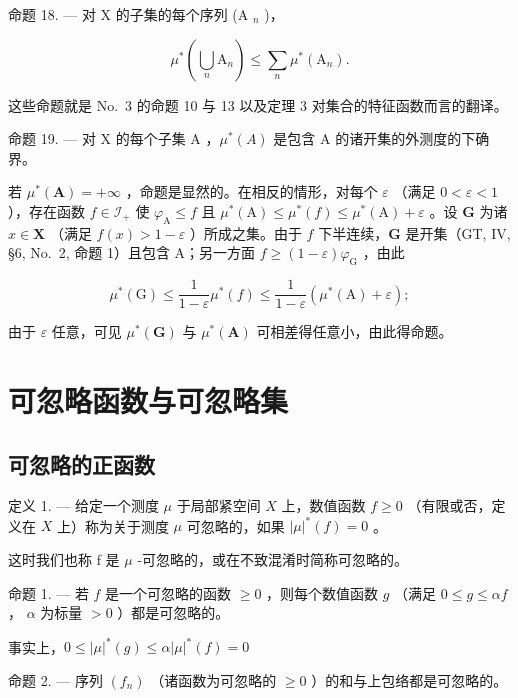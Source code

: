 命题 18. --- 对 X 的子集的每个序列 (A \(_{n}\) )，

\[
\mu^ {*} \left(\bigcup_ {n} \mathrm{A} _ {n}\right) \leqslant \sum_ {n} \mu^ {*} (\mathrm{A} _ {n}).
\]

这些命题就是 No.~3 的命题 10 与 13 以及定理 3 对集合的特征函数而言的翻译。

命题 19. --- 对 X 的每个子集 A ，\(\mu^{*}(A)\) 是包含 A 的诸开集的外测度的下确界。

若 \(\mu^{*}(\mathbf{A}) = +\infty\) ，命题是显然的。在相反的情形，对每个 \(\varepsilon\) （满足 \(0 < \varepsilon < 1\) ），存在函数 \(f \in \mathcal{I}_{+}\) 使 \(\varphi_{\mathrm{A}} \leqslant f\) 且 \(\mu^{*}(\mathrm{A}) \leqslant \mu^{*}(f) \leqslant \mu^{*}(\mathrm{A}) + \varepsilon\) 。设 \(\mathbf{G}\) 为诸 \(x \in \mathbf{X}\) （满足 \(f(x) > 1 - \varepsilon\) ）所成之集。由于 \(f\) 下半连续，\(\mathbf{G}\) 是开集（GT, IV, §6, No.~2, 命题 1）且包含 A；另一方面 \(f \geqslant (1 - \varepsilon)\varphi_{\mathrm{G}}\) ，由此

\[
\mu^ {*} (\mathrm{G}) \leqslant \frac {1}{1 - \varepsilon} \mu^ {*} (f) \leqslant \frac {1}{1 - \varepsilon} \left(\mu^ {*} (\mathrm{A}) + \varepsilon\right);
\]

由于 \(\varepsilon\) 任意，可见 \(\mu^{*}(\mathbf{G})\) 与 \(\mu^{*}(\mathbf{A})\) 可相差得任意小，由此得命题。

\section{可忽略函数与可忽略集}

\subsection{可忽略的正函数}

定义 1. --- 给定一个测度 \(\mu\) 于局部紧空间 \(X\) 上，数值函数 \(f \geqslant 0\) （有限或否，定义在 \(X\) 上）称为关于测度 \(\mu\) 可忽略的，如果 \(|\mu|^*(f) = 0\) 。

这时我们也称 f 是 \(\mu\) -可忽略的，或在不致混淆时简称可忽略的。

命题 1. --- 若 \(f\) 是一个可忽略的函数 \(\geqslant 0\) ，则每个数值函数 \(g\) （满足 \(0 \leqslant g \leqslant \alpha f\) ， \(\alpha\) 为标量 \(> 0\) ）都是可忽略的。

事实上，\(0 \leqslant |\mu|^*(g) \leqslant \alpha |\mu|^*(f) = 0\)

命题 2. --- 序列 \((f_{n})\) （诸函数为可忽略的 \(\geqslant0\) ）的和与上包络都是可忽略的。

